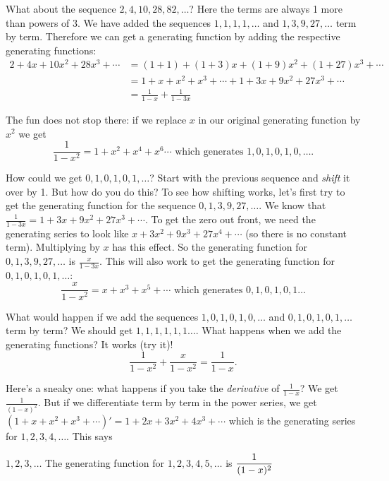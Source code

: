 \documentclass[12pt]{article}
\begin{document}
What about the sequence $2, 4, 10, 28, 82, \ldots$?  Here the terms are always 1 more than powers of 3.  We have added the sequences $1,1,1,1,\ldots$ and $1,3,9, 27,\ldots$ term by term.  Therefore we can get a generating function by adding the respective generating functions:
\begin{align*}
2 + 4x + 10x^2 + 28x^3 + \cdots  & = (1 + 1) + (1 + 3)x + (1 + 9)x^2 + (1 + 27)x^3 + \cdots \\
& = 1 + x + x^2 + x^3 + \cdots + 1 + 3x + 9x^2 + 27x^3 + \cdots \\
& = \frac{1}{1-x} + \frac{1}{1-3x}
\end{align*}
 
The fun does not stop there: if we replace $x$ in our original generating function by $x^2$ we get
 \[\frac{1}{1-x^2} = 1 + x^2  + x^4 + x^6\cdots \mbox{ which generates } 1, 0, 1, 0, 1, 0, \ldots.\]
 
How could we get $0,1,0,1,0,1,\ldots$?  Start with the previous sequence and {\em shift} it over by 1.  But how do you do this?  To see how shifting works, let's first try to get the generating function for the sequence $0, 1, 3, 9, 27, \ldots$.  We know that $\frac{1}{1-3x} = 1 + 3x + 9x^2 + 27x^3 + \cdots$.  To get the zero out front, we need the generating series to look like $x + 3x^2 + 9x^3 + 27x^4+ \cdots$ (so there is no constant term).  Multiplying by $x$ has this effect.  So the generating function for $0, 1, 3, 9, 27, \ldots$ is $\frac{x}{1-3x}$.  This will also work to get the generating function for $0,1,0,1,0,1,\ldots$:
 \[\frac{x}{1-x^2} = x + x^3 + x^5 + \cdots \mbox{ which generates } 0, 1, 0, 1, 0 , 1 \ldots\]
 
What would happen if we add the sequences $1,0,1,0,1,0,\ldots$ and $0,1,0,1,0,1,\ldots$ term by term?  We should get $1,1,1,1,1,1\ldots$.  What happens when we add the generating functions?  It works (try it)!
 \[\frac{1}{1-x^2} + \frac{x}{1-x^2} = \frac{1}{1-x}.\]
 

Here's a sneaky one: what happens if you take the \emph{derivative} of $\frac{1}{1-x}$?  We get $\frac{1}{(1-x)^2}$.  But if we differentiate term by term in the power series, we get $(1 + x + x^2 + x^3 + \cdots)' = 1 + 2x + 3x^2 + 4x^3 + \cdots $ which is the generating series for $1, 2, 3, 4, \ldots$.  This says

\begin{defbox}{$1,2,3,\ldots$}
 The generating function for $1, 2, 3, 4, 5, \ldots$ is $\displaystyle\frac{1}{(1-x)^2}$
\end{defbox}
\end{document}
